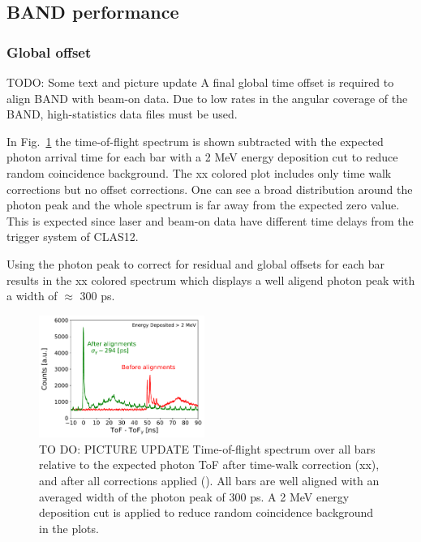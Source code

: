 \documentclass[3p,final,twocolumn]{elsarticle}
\begin{document}
\subsection{BAND performance} 
\subsubsection{Global offset}
\label{sec:global_offset}
{\color{red} TODO: Some text and picture update}
A final global time offset is required to align BAND with beam-on data. Due to low rates in the angular coverage of the BAND, 
high-statistics data files must be used. 

In Fig.~\ref{fig:final_offset} the time-of-flight spectrum is shown subtracted with the expected photon arrival time for each bar with a 2 \si{\mega\electronvolt} energy deposition cut to reduce random coincidence background. The xx colored plot includes only time walk corrections but no offset corrections. One can see a broad distribution around the photon peak and the whole spectrum is far away from the expected zero value. This is expected since laser and beam-on data have different time delays from the trigger system of CLAS12. 

Using the photon peak to correct for residual and global offsets for each bar results in the xx colored spectrum which displays a well aligend photon peak with a width of $\approx$ 300 \si{\pico\s}.

\begin{figure}[tb]
	\centering
		\includegraphics[width=0.48\textwidth]{time-alignment.pdf}
	\caption{TO DO: PICTURE UPDATE  Time-of-flight spectrum over all bars relative to the expected photon ToF after time-walk correction (xx), %
	and after all corrections applied (). All bars are well aligned with an averaged width of the photon peak of 300 \si{\pico\s}. A 2 \si{\mega\electronvolt} energy deposition cut is applied to reduce random coincidence background in the plots.}
	\label{fig:final_offset}
\end{figure}
\end{document}
